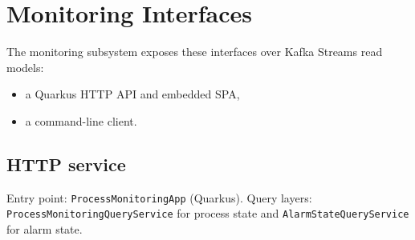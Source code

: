 \section{Monitoring Interfaces}
\label{sec:MonitoringInterfaces}

The monitoring subsystem exposes these interfaces over Kafka Streams read models:
\begin{itemize}
\item a Quarkus HTTP API and embedded SPA,
\item a command-line client.
\end{itemize}

\subsection{HTTP service}

Entry point: \texttt{ProcessMonitoringApp} (Quarkus). Query layers:
\texttt{ProcessMonitoringQueryService} for process state and
\texttt{AlarmStateQueryService} for alarm state.

